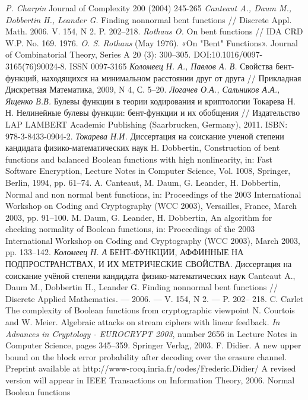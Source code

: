 \begin{thebibliography}{99}
 {\it P. Charpin} Journal of Complexity 200 (2004) 245-265
 {\it Canteaut A., Daum M., Dobbertin H., Leander G.} Finding nonnormal bent
functions // Discrete Appl. Math. 2006. V. 154, N 2. P. 202–218.
 {\it Rothaus O.} On bent functions // IDA CRD W.P. No. 169. 1976.
  {\it O. S. Rothaus} (May 1976). «On "Bent" Functions». Journal of Combinatorial Theory, Series A 20 (3): 300–305. DOI:10.1016/0097-3165(76)90024-8. ISSN 0097-3165
 {\it Коломеец Н. А., Павлов А. В.} Свойства бент-функций, находящихся
на минимальном расстоянии друг от друга // Прикладная Дискретная
Математика, 2009, N 4, С. 5–20.
 {\it Логачев О.А., Сальников А.А., Ященко В.В.} Булевы функции в теории кодирования и криптологии
Токарева Н. Н. Нелинейные булевы функции: бент-функции и их обобщения // Издательство LAP
LAMBERT Academic Publishing (Saarbrucken, Germany), 2011. ISBN: 978-3-8433-0904-2.
 {\it Токарева Н.И.} Диссертация на соискание ученой степени
кандидата физико-математических наук
 H. Dobbertin, Construction of bent functions and balanced Boolean functions with high
nonlinearity, in: Fast Software Encryption, Lecture Notes in Computer Science, Vol. 1008, Springer,
Berlin, 1994, pp. 61–74.
A. Canteaut, M. Daum, G. Leander, H. Dobbertin, Normal and non normal bent functions, in:
Proceedings of the 2003 International Workshop on Coding and Cryptography (WCC 2003),
Versailles, France, March 2003, pp. 91–100.
 M. Daum, G. Leander, H. Dobbertin, An algorithm for checking normality of Boolean functions, in:
Proceedings of the 2003 International Workshop on Coding and Cryptography (WCC 2003), March
2003, pp. 133–142.
 {\it Коломеец Н. А} БЕНТ-ФУНКЦИИ, АФФИННЫЕ НА ПОДПРОСТРАНСТВАХ, И ИХ
МЕТРИЧЕСКИЕ СВОЙСТВА. Диссертация на соискание учёной степени
кандидата физико-математических наук
 Canteaut A., Daum M., Dobbertin H., Leander G. Finding nonnormal bent
functions // Discrete Applied Mathematics. — 2006. — V. 154, N 2. — P. 202–
218.
 C. Carlet The complexity of Boolean functions from cryptographic viewpoint
N. Courtois and W. Meier. Algebraic attacks on stream ciphers with linear feedback. {\it In Advances in Cryptology - EUROCRYPT 2003}, number 2656 in Lecture Notes in Computer Science, pages 345–359. Springer Verlag,  2003.
 F. Didier. A new upper bound on the block error probability after decoding over the erasure channel. Preprint available at http://www-rocq.inria.fr/codes/Frederic.Didier/ A revised version will appear in IEEE Transactions on Information Theory, 2006.
 Normal Boolean functions





\end{thebibliography}
